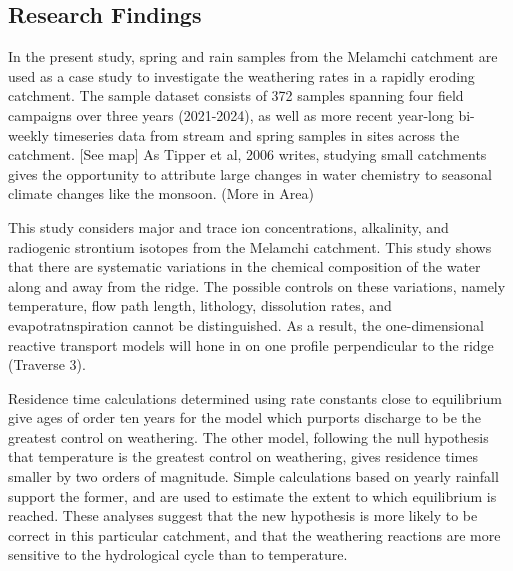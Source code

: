 \subsection{Research Findings}

In the present study, spring and rain samples from the Melamchi catchment are used as a case 
study to investigate the weathering rates in a rapidly eroding catchment. The sample dataset consists of 372 samples spanning four field campaigns over three years (2021-2024), as well as more recent year-long bi-weekly timeseries data from stream and spring samples in sites across the catchment. [See map] 
As Tipper et al, 2006 writes, studying small catchments gives the opportunity to attribute large changes in water chemistry to seasonal climate changes like the monsoon. (More in Area)



\bsk

This study considers major and trace ion concentrations, alkalinity, and radiogenic strontium isotopes from the Melamchi catchment. This study shows that there are systematic variations in the chemical composition of the water along and away from the ridge. The possible controls on these variations, namely temperature, flow path length, lithology, dissolution rates, and evapotratnspiration cannot be distinguished. As a result, the one-dimensional reactive transport models will hone in on one profile perpendicular to the ridge (Traverse 3).

\bsk

Residence time calculations determined using rate constants close to equilibrium give ages of order ten years for the model which purports discharge to be the greatest control on weathering. The other model, following the null hypothesis that temperature is the greatest control on weathering, gives residence times smaller by two orders of magnitude. Simple calculations based on yearly rainfall support the former, and are used to estimate the extent to which equilibrium is reached. These analyses suggest that the new hypothesis is more likely to be correct in this particular catchment, and that the weathering reactions are more sensitive to the hydrological cycle than to temperature.




    
